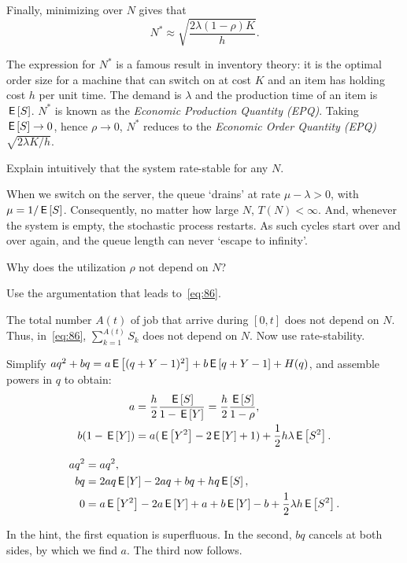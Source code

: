 Finally, minimizing over $N$ gives that
\begin{equation*}
  N^* \approx \sqrt{\frac{2\lambda(1-\rho)K}{h}}.
\end{equation*}

The expression for $N^*$ is a famous result in inventory theory: it is the optimal order size for a machine that can switch on at cost $K$ and an item has holding cost $h$ per unit time. The demand is $\lambda$ and the production time of an item is $\,\mathsf{E}\left[S\right]$. 
$N^*$ is known as the \emph{Economic Production Quantity (EPQ)}.
Taking $\,\mathsf{E}\left[S\right] \to 0$, hence $\rho \to 0$, $N^*$ reduces to the \emph{Economic Order Quantity (EPQ)} $\sqrt{2\lambda K/h}$.





\begin{exercise}
Explain intuitively that the system rate-stable for any $N$.
\begin{solution}
  When we switch on the server, the queue `drains' at rate $\mu-\lambda>0$, with $\mu=1/\,\mathsf{E}\left[S\right]$.
  Consequently, no matter how large $N$, $T(N)<\infty$. 
  And, whenever the system is empty, the stochastic process restarts.
  As such cycles start over and over again, and the queue length can never `escape to infinity'.
\end{solution}
\end{exercise}


\begin{exercise}
  Why does the utilization $\rho$ not depend on $N$?
\begin{hint}
 Use the argumentation that leads to~\cref{eq:86}.
\end{hint}
\begin{solution}
  The total number $A(t)$ of job that arrive during $[0,t]$ does not depend on $N$.
  Thus, in~\cref{eq:86}, $\sum_{k=1}^{A(t)}S_k$ does not depend on $N$.
  Now use rate-stability.
\end{solution}
\end{exercise}

\begin{exercise}\label{ex:68}
Simplify $a q^2 +b q = a\,\mathsf{E}\left[(q+Y-1)^2\right] + b\,\mathsf{E}\left[q+Y-1\right]+ H(q)$, and assemble powers in $q$ to obtain:
\begin{align*}
  a &= \frac h 2 \frac{\,\mathsf{E}\left[S\right]}{1-\,\mathsf{E}\left[Y\right]} = \frac{h}{2} \frac{\,\mathsf{E}\left[S\right]}{1- \rho}, \\
  b(1-\,\mathsf{E}\left[Y\right]) &= a(\,\mathsf{E}\left[Y^2\right] - 2 \,\mathsf{E}\left[Y\right] + 1) + \frac 12 h \lambda \,\mathsf{E}\left[S^2\right].
\end{align*}
\begin{hint}
\begin{align*}
  a q^2 &= a q^2, \\
  b q &= 2a q \,\mathsf{E}\left[Y\right] - 2a q + b q + h q \,\mathsf{E}\left[S\right],\\
  0 &= a \,\mathsf{E}\left[Y^2\right] - 2a \,\mathsf{E}\left[Y\right] + a + b \,\mathsf{E}\left[Y\right] - b + \frac 12 \lambda h \,\mathsf{E}\left[S^2\right].
\end{align*}
\end{hint}
\begin{solution}
  In the hint, the first equation is superfluous.
  In the second, $bq$ cancels at both sides, by which we find $a$.
  The third now follows.
\end{solution}
\end{exercise}

